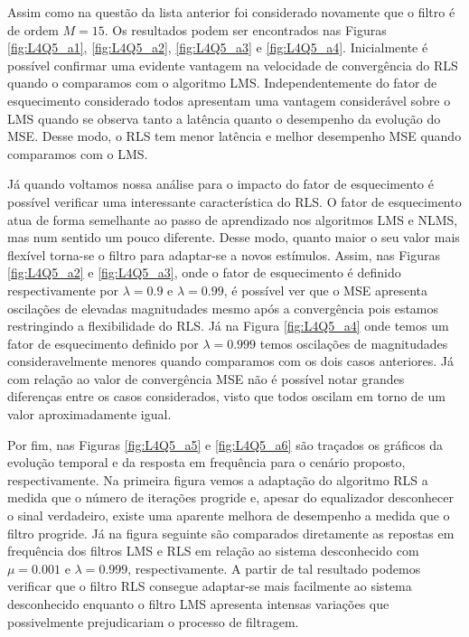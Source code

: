 Assim como na questão da lista anterior foi considerado novamente que o filtro é de ordem $M = 15$.
Os resultados podem ser encontrados nas Figuras \ref{fig:L4Q5_a1}, \ref{fig:L4Q5_a2}, \ref{fig:L4Q5_a3} e \ref{fig:L4Q5_a4}.
Inicialmente é possível confirmar uma evidente vantagem na velocidade de convergência do RLS quando o comparamos com o algoritmo LMS.
Independentemente do fator de esquecimento considerado todos apresentam uma vantagem considerável sobre o LMS quando se observa tanto a 
latência quanto o desempenho da evolução do MSE. Desse modo, o RLS tem menor latência e melhor desempenho MSE quando comparamos com o LMS.

Já quando voltamos nossa análise para o impacto do fator de esquecimento é possível verificar uma interessante característica do 
RLS. O fator de esquecimento atua de forma semelhante ao passo de aprendizado nos algoritmos LMS e NLMS, mas num sentido um  pouco diferente. Desse modo, quanto
maior o seu valor mais flexível torna-se o filtro para adaptar-se a novos estímulos. Assim, nas Figuras \ref{fig:L4Q5_a2} e \ref{fig:L4Q5_a3}, onde o 
fator de esquecimento é definido respectivamente por $\lambda = 0.9$ e $\lambda = 0.99$, é possível ver que o MSE apresenta oscilações de 
elevadas magnitudades mesmo após a convergência pois estamos restringindo a flexibilidade do RLS. Já na Figura \ref{fig:L4Q5_a4} onde temos um fator de esquecimento 
definido por $\lambda = 0.999$ temos oscilações de magnitudades consideravelmente menores quando comparamos com os dois casos anteriores. Já com relação ao valor de convergência
MSE não é possível notar grandes diferenças entre os casos considerados, visto que todos oscilam em torno de um valor aproximadamente igual.

Por fim, nas Figuras \ref{fig:L4Q5_a5} e \ref{fig:L4Q5_a6} são traçados os gráficos da evolução temporal e da resposta em frequência para
o cenário proposto, respectivamente. Na primeira figura vemos a adaptação do algoritmo RLS a medida que o número de iterações progride e, apesar do
equalizador desconhecer o sinal verdadeiro, existe uma aparente melhora de desempenho a medida que o filtro progride. Já na figura seguinte são comparados
diretamente as repostas em frequência dos filtros LMS e RLS em relação ao sistema desconhecido com $\mu = 0.001$ e $\lambda = 0.999$, respectivamente.
A partir de tal resultado podemos verificar que o filtro RLS consegue adaptar-se mais facilmente ao sistema desconhecido enquanto o filtro LMS apresenta
intensas variações que possivelmente prejudicariam o processo de filtragem.



